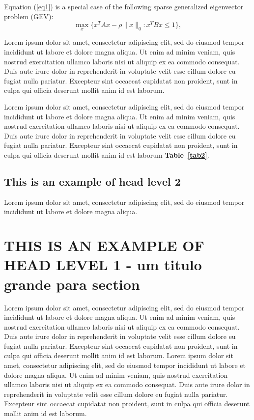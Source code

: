 \documentclass{sbc2025}%
\begin{document}
Equation (\ref{eq1}) is a special case of the following sparse generalized eigenvector problem (GEV):
\begin{equation}\label{GEV}
\max\limits_{x}\{x^TAx-\rho \|x\|_0: x^TBx\leq 1\},
\end{equation}

Lorem ipsum dolor sit amet, consectetur adipiscing elit, sed do eiusmod tempor incididunt ut labore et dolore magna aliqua. Ut enim ad minim veniam, quis nostrud exercitation ullamco laboris nisi ut aliquip ex ea commodo consequat. Duis aute irure dolor in reprehenderit in voluptate velit esse cillum dolore eu fugiat nulla pariatur. Excepteur sint occaecat cupidatat non proident, sunt in culpa qui officia deserunt mollit anim id est laborum. 

Lorem ipsum dolor sit amet, consectetur adipiscing elit, sed do eiusmod tempor incididunt ut labore et dolore magna aliqua. Ut enim ad minim veniam, quis nostrud exercitation ullamco laboris nisi ut aliquip ex ea commodo consequat. Duis aute irure dolor in reprehenderit in voluptate velit esse cillum dolore eu fugiat nulla pariatur. Excepteur sint occaecat cupidatat non proident, sunt in culpa qui officia deserunt mollit anim id est laborum \textbf{Table~\ref{tab2}}.

\subsection{This is an example of head level 2}

Lorem ipsum dolor sit amet, consectetur adipiscing elit, sed do eiusmod tempor incididunt ut labore et dolore magna aliqua.

\section{THIS IS AN EXAMPLE OF HEAD LEVEL 1  - um titulo grande para section}

Lorem ipsum dolor sit amet, consectetur adipiscing elit, sed do eiusmod tempor incididunt ut labore et dolore magna aliqua. Ut enim ad minim veniam, quis nostrud exercitation ullamco laboris nisi ut aliquip ex ea commodo consequat. Duis aute irure dolor in reprehenderit in voluptate velit esse cillum dolore eu fugiat nulla pariatur. Excepteur sint occaecat cupidatat non proident, sunt in culpa qui officia deserunt mollit anim id est laborum. Lorem ipsum dolor sit amet, consectetur adipiscing elit, sed do eiusmod tempor incididunt ut labore et dolore magna aliqua. Ut enim ad minim veniam, quis nostrud exercitation ullamco laboris nisi ut aliquip ex ea commodo consequat. Duis aute irure dolor in reprehenderit in voluptate velit esse cillum dolore eu fugiat nulla pariatur. Excepteur sint occaecat cupidatat non proident, sunt in culpa qui officia deserunt mollit anim id est laborum.
\end{document}
